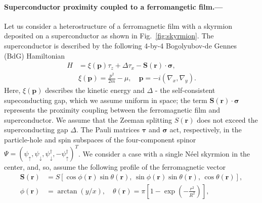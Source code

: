 \documentclass[twocolumn,showpacs,floatfix,longbibliography]{revtex4-1}
\begin{document}
\paragraph*{Superconductor proximity coupled to a ferromangetic film.--- }  \label{sec:model}
Let us consider a heterostructure of a ferromagnetic film with a skyrmion deposited on a superconductor as shown in Fig.~\ref{fig:skyrmion}. The superconductor is described by the following 4-by-4 Bogolyubov-de Gennes (BdG) Hamiltonian 
\begin{align}
 H &= \xi(\bm p)\tau_z+\Delta \tau_x - \bm S(\bm r)\cdot\bm\sigma, \label{ham} \\
   & \xi(\bm p) = \frac{p^2}{2m}-\mu,\quad \bm p = -i(\nabla_x,\nabla_y).
\end{align}
Here, $\xi(\bm p)$ describes the kinetic energy and $\Delta$ - the self-consistent supeconducting gap, which we assume uniform in space; the term $\bm S(\bm r)\cdot\bm\sigma$ represents the proximity coupling between the ferromagnetic film and superconductor. We assume that the Zeeman splitting $S(\bm r)$ does not exceed the superconducting gap $\Delta$. The Pauli matrices $\bm \tau$ and $\bm \sigma$ act, respectively, in the particle-hole and spin subspaces of the four-component spinor $\Psi = (\psi_\uparrow,\psi_\downarrow,\psi^\dagger_\downarrow,-\psi^\dagger_\uparrow)^T$. We consider a case with a single N\'eel skyrmion in the center, and, so, assume the following profile of the ferromagnetic vector
\begin{align}
	\bm S(\bm r) &= S\left[ \cos\phi(\bm r) \sin\theta(\bm r),\, \sin\phi(\bm r)\sin\theta(\bm r),\,\cos\theta(\bm r)\right],\nonumber  \\   
	\phi(\bm r) &= \arctan(y/x),\quad \theta(\bm r) = \pi \left[ 1-\exp\left( -\frac{r^2}{R^2} \right) \right], \label{conf}	
\end{align}
\end{document}
